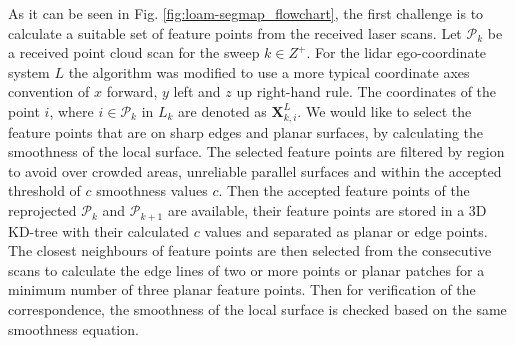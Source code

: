 \documentclass[letterpaper, 10 pt, conference]{ieeeconf}  %
\begin{document}
As it can be seen in Fig. \ref{fig:loam-segmap_flowchart}, the first challenge is to calculate a suitable set of feature points from the received laser scans. Let $\mathcal{P}_k$ be a received point cloud scan for the sweep $k \in Z^+$. For the lidar ego-coordinate system ${L}$ the algorithm was modified to use a more typical coordinate axes convention of $x$ forward, $y$ left and $z$ up right-hand rule. The coordinates of the point $i$, where $i \in \mathcal{P}_k$ in ${L_k}$ are denoted as $\boldsymbol{X}_{k,i}^L$. 
We would like to select the feature points that are on sharp edges and planar surfaces, by calculating the smoothness of the local surface. The selected feature points are filtered by region to avoid over crowded areas, unreliable parallel surfaces and  within the accepted threshold of $c$ smoothness values $c$.
Then the accepted feature points of the reprojected $\mathcal{P}_k$ and $\mathcal{P}_{k+1}$ are available, their feature points are stored in a 3D KD-tree with their calculated $c$ values and separated as planar or edge points. The closest neighbours of feature points are then selected from the consecutive scans to calculate the edge lines of two or more points or planar patches for a minimum number of three planar feature points. Then for verification of the correspondence, the smoothness of the local surface is checked based on the same smoothness equation.
\end{document}
